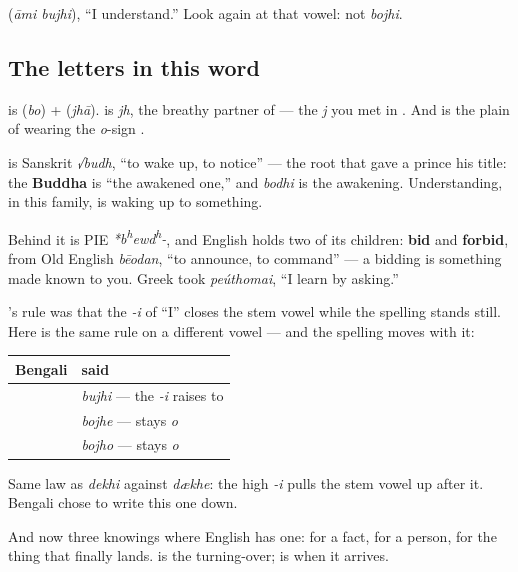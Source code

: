   (\emph{āmi bujhi}), \textquotedblleft{}I understand.\textquotedblright{} Look again at that vowel: not \emph{bojhi}.

\subsection*{The letters in this word}
\textbf{} is \textbf{} (\emph{bo}) + \textbf{} (\emph{jhā}). \textbf{} is \emph{jh}, the breathy partner of \textbf{} — the \emph{j} you met in . And \textbf{} is the plain \textbf{} of  wearing the \emph{o}-sign \textbf{}.

\begin{cousinweb}
\textbf{} is Sanskrit \emph{√budh}, \textquotedblleft{}to wake up, to notice\textquotedblright{} — the root that gave a prince his title: the \textbf{Buddha} is \textquotedblleft{}the awakened one,\textquotedblright{} and \emph{bodhi} is the awakening. Understanding, in this family, is waking up to something.

Behind it is PIE \emph{*b\textsuperscript{h}ewd\textsuperscript{h}-}, and English holds two of its children: \textbf{bid} and \textbf{forbid}, from Old English \emph{bēodan}, \textquotedblleft{}to announce, to command\textquotedblright{} — a bidding is something made known to you. Greek took \emph{peúthomai}, \textquotedblleft{}I learn by asking.\textquotedblright{}
\end{cousinweb}

\begin{grammarlens}[title={Grammar Lens: the harmony again, and this time you can see it}]
's rule was that the \emph{-i} of \textquotedblleft{}I\textquotedblright{} closes the stem vowel while the spelling stands still. Here is the same rule on a different vowel — and the spelling moves with it:

\noindent
\begin{tabularx}{\linewidth}{@{}>{\raggedright\arraybackslash}X>{\raggedright\arraybackslash}X@{}}
\toprule
\textbf{Bengali} & \textbf{said} \\
\midrule
\bn{আমি} \bn{বুঝি} & \emph{bujhi} — the \emph{-i} raises \textbf{\bn{ো}} to \textbf{\bn{ু}} \\
\bn{সে} \bn{বোঝে} & \emph{bojhe} — stays \emph{o} \\
\bn{তুমি} \bn{বোঝো} & \emph{bojho} — stays \emph{o} \\
\bottomrule
\end{tabularx}

Same law as \emph{dekhi} against \emph{dækhe}: the high \emph{-i} pulls the stem vowel up after it. Bengali chose to write this one down.

And now three knowings where English has one: \textbf{} for a fact, \textbf{} for a person, \textbf{} for the thing that finally lands.  is the turning-over;  is when it arrives.
\end{grammarlens}

